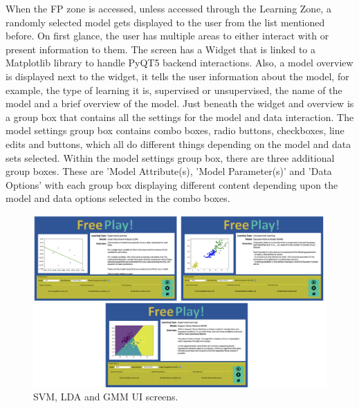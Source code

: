 		When the FP zone is accessed, unless accessed through the Learning Zone, a randomly selected model gets displayed to the user from the list mentioned before. On first glance, the user has multiple areas to either interact with or present information to them. The screen has a Widget that is linked to a Matplotlib library to handle PyQT5 backend interactions. Also, a model overview is displayed next to the widget, it tells the user information about the model, for example, the type of learning it is, supervised or unsupervised, the name of the model and a brief overview of the model. Just beneath the widget and overview is a group box that contains all the settings for the model and data interaction. The model settings group box contains combo boxes, radio buttons, checkboxes,  line edits and buttons, which all do different things depending on the model and data sets selected. Within the model settings group box, there are three additional group boxes. These are 'Model Attribute(s), 'Model Parameter(s)' and 'Data Options' with each group box displaying different content depending upon the model and data options selected in the combo boxes.
		
		\begin{figure}[t]
			\begin{center}
				\includegraphics[width=12cm]{graphics/remaining_fp_examples.png}
				\caption{SVM, LDA and GMM UI screens.}
				\label{fig:others_example}
			\end{center}
		\end{figure}
		
